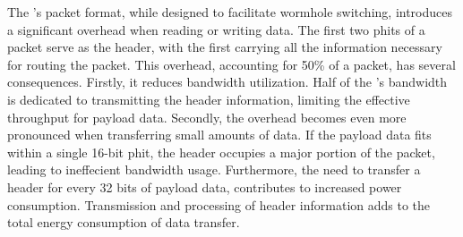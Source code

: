 The \confignoc{}'s packet format, while designed to facilitate wormhole switching, introduces a significant overhead when reading or writing data.
The first two phits of a packet serve as the header, with the first carrying all the information necessary for routing the packet.
This overhead, accounting for 50\% of a packet, has several consequences.
Firstly, it reduces bandwidth utilization.
Half of the \confignoc{}'s bandwidth is dedicated to transmitting the header information, limiting the effective throughput for payload data.
Secondly, the overhead becomes even more pronounced when transferring small amounts of data.
If the payload data fits within a single 16-bit phit, the header occupies a major portion of the packet, leading to ineffecient bandwidth usage.
Furthermore, the need to transfer a header for every 32 bits of payload data, contributes to increased power consumption.
Transmission and processing of header information adds to the total energy consumption of data transfer.
